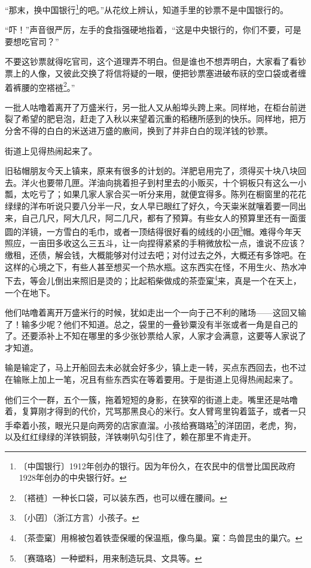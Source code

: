 \documentclass[12pt,UTF-8,openany]{ctexbook}
\begin{document}
\begin{large}
    “那末，换中国银行\footnote{〔中国银行〕1912年创办的银行。因为年份久，在农民中的信誉比国民政府1928年创办的中央银行好。}的吧。”从花纹上辨认，知道手里的钞票不是中国银行的。
    
    “吓！”声音很严厉，左手的食指强硬地指着，“这是中央银行的，你们不要，可是要想吃官司？”
    
    不要这钞票就得吃官司，这个道理弄不明白。但是谁也不想弄明白，大家看了看钞票上的人像，又彼此交换了将信将疑的一眼，便把钞票塞进破布祆的空口袋或者缠着裤腰的空褡裢\footnote{〔褡裢〕一种长口袋，可以装东西，也可以缠在腰间。}。”
    
    一批人咕噜着离开了万盛米行，另一批人又从船埠头跨上来。同样地，在柜台前迸裂了希望的肥皂泡，赶走了入秋以来望着沉重的稻穗所感到的快乐。同样地，把万分舍不得的白白的米送进万盛的廒间，换到了并非白白的现洋钱的钞票。
    
    街道上见得热闹起来了。
    
    旧毡帽朋友今天上镇来，原来有很多的计划的。洋肥皂用完了，须得买十块八块回去。洋火也要带几匣。洋油向挑着担子到村里去的小贩买，十个铜板只有这么一小瓢，太吃亏了；如果几家人家合买一听分来用，就便宜得多。陈列在橱窗里的花花绿绿的洋布听说只要八分半一尺，女人早已眼红了好久，今天粜米就嚷着要一同出来，自己几尺，阿大几尺，阿二几尺，都有了预算。有些女人的预算里还有一面蛋圆的洋镜，一方雪白的毛巾，或者一顶结得很好看的绒线的小囝\footnote{〔小囝〕（浙江方言）小孩子。}帽。难得今年天照应，一亩田多收这么三五斗，让一向捏得紧紧的手稍微放松一点，谁说不应该？缴租，还债，解会钱，大概能够对付过去吧；对付过去之外，大概还有多馀吧。在这样的心境之下，有些人甚至想买一个热水瓶。这东西实在怪，不用生火、热水冲下去，等会儿倒出来照旧是烫的；比起稻柴做成的茶壶窠\footnote{〔茶壶窠〕用棉被包着铁壶保暖的保温瓶，像鸟巢。窠：鸟兽昆虫的巢穴。}来，真是一个在天上，一个在地下。
    
    他们咕噜着离开万盛米行的时候，犹如走出一个一向于己不利的赌场——这回又输了！输多少呢？他们不知道。总之，袋里的一叠钞粟没有半张或者一角是自己的了。还要添补上不知在哪里的多少张钞票给人家，人家才会满意，这要等人家说了才知道。
    
    输是输定了，马上开船回去未必就会好多少，镇上走一转，买点东西回去，也不过在输账上加上一笔，况且有些东西实在等着要用。于是街道上见得热闹起来了。
    
    他们三个一群，五个一簇，拖着短短的身影，在狭窄的街道上走。嘴里还是咕噜着，复算刚才得到的代价，咒骂那黑良心的米行。女人臂弯里钩着篮子，或者一只手牵着小孩，眼光只是向两旁的店家直溜。小孩给赛璐珞\footnote{〔赛璐珞〕一种塑料，用来制造玩具、文具等。}的洋囝囝，老虎，狗，以及红红绿绿的洋铁铜鼓，洋铁喇叭勾引住了，赖在那里不肯走开。
    

\end{large}
\end{document}
